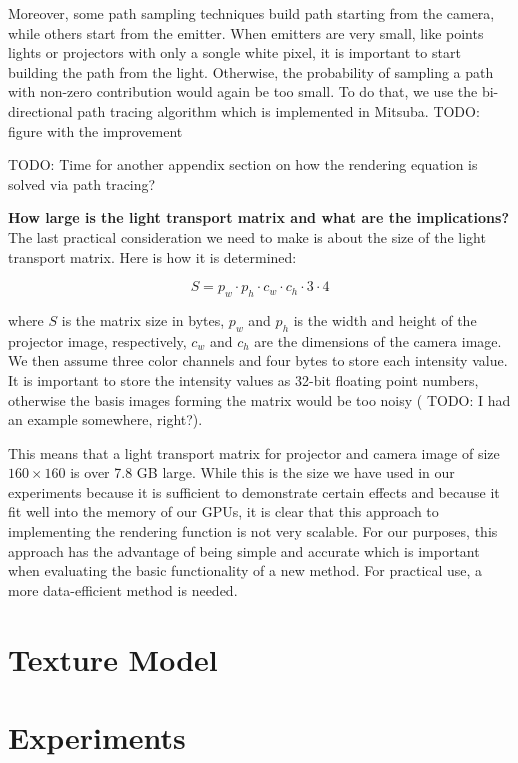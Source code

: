 Moreover, some path sampling techniques build path starting from the camera, while others start from the emitter. When emitters are very small, like points lights or projectors with only a songle white pixel, it is important to start building the path from the light. Otherwise, the probability of sampling a path with non-zero contribution would again be too small. To do that, we use the bi-directional path tracing algorithm which is implemented in Mitsuba. {\color{red} TODO: figure with the improvement}

{\color{red} TODO: Time for another appendix section on how the rendering equation is solved via path tracing?}

\textbf{How large is the light transport matrix and what are the implications?} The last practical consideration we need to make is about the size of the light transport matrix. Here is how it is determined:

\begin{equation}
    \label{eq:lt_matrix_size}
    S = p_w \cdot p_h \cdot c_w \cdot c_h \cdot 3 \cdot 4
\end{equation}

where \(S\) is the matrix size in bytes, \(p_w\) and \(p_h\) is the width and height of the projector image, respectively, \(c_w\) and \(c_h\) are the dimensions of the camera image. We then assume three color channels and four bytes to store each intensity value. It is important to store the intensity values as 32-bit floating point numbers, otherwise the basis images forming the matrix would be too noisy ({\color{red} TODO: I had an example somewhere, right?}).

This means that a light transport matrix for projector and camera image of size \(160 \times 160\) is over 7.8 GB large. While this is the size we have used in our experiments because it is sufficient to demonstrate certain effects and because it fit well into the memory of our GPUs, it is clear that this approach to implementing the rendering function is not very scalable. For our purposes, this approach has the advantage of being simple and accurate which is important when evaluating the basic functionality of a new method. For practical use, a more data-efficient method is needed.

\section{Texture Model}
\label{section:methods-texture_model}

\section{Experiments}
\label{section:method-experiments}